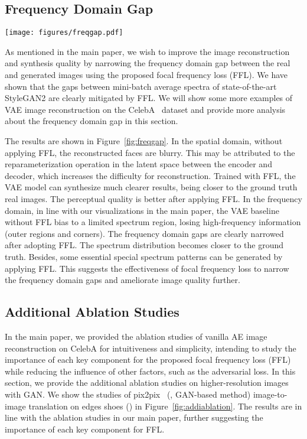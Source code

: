 \documentclass[10pt,twocolumn,letterpaper]{article}
\begin{document}
\subsection{Frequency Domain Gap}
\label{sec:freqgap}


\begin{figure*}[t]
	\centering
\texttt{[image: figures/freqgap.pdf]}
\caption{Frequency domain gaps are narrowed by the focal frequency loss (FFL) for VAE image reconstruction on CelebA.}
	\label{fig:freqgap}
\end{figure*}


As mentioned in the main paper, we wish to improve the image reconstruction and synthesis quality by narrowing the frequency domain gap between the real and generated images using the proposed focal frequency loss (FFL).
We have shown that the gaps between mini-batch average spectra of state-of-the-art StyleGAN2 are clearly mitigated by FFL.
We will show some more examples of VAE image reconstruction on the CelebA~\cite{celeba} dataset and provide more analysis about the frequency domain gap in this section.

The results are shown in Figure~\ref{fig:freqgap}.
In the spatial domain, without applying FFL, the reconstructed faces are blurry. This may be attributed to the reparameterization operation in the latent space between the encoder and decoder, which increases the difficulty for reconstruction.
Trained with FFL, the VAE model can synthesize much clearer results, being closer to the ground truth real images. The perceptual quality is better after applying FFL.
In the frequency domain, in line with our visualizations in the main paper, the VAE baseline without FFL bias to a limited spectrum region, losing high-frequency information (outer regions and corners).
The frequency domain gaps are clearly narrowed after adopting FFL. The spectrum distribution becomes closer to the ground truth. Besides, some essential special spectrum patterns can be generated by applying FFL.
This suggests the effectiveness of focal frequency loss to narrow the frequency domain gaps and ameliorate image quality further.


\subsection{Additional Ablation Studies}
\label{sec:addiablation}

In the main paper, we provided the ablation studies of vanilla AE image reconstruction on CelebA for intuitiveness and simplicity, intending to study the importance of each key component for the proposed focal frequency loss (FFL) while reducing the influence of other factors, such as the adversarial loss.
In this section, we provide the additional ablation studies on higher-resolution images with GAN. We show the studies of pix2pix~\cite{pix2pix} (\ie, GAN-based method) image-to-image translation on edges  shoes () in Figure~\ref{fig:addiablation}. The results are in line with the ablation studies in our main paper, further suggesting the importance of each key component for FFL.
\end{document}
